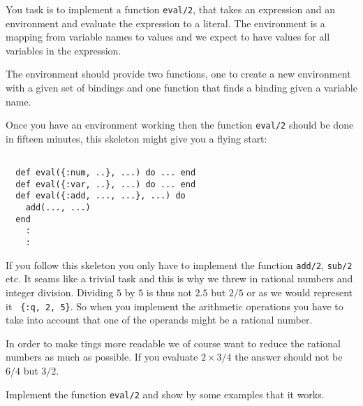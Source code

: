 \documentclass[a4paper,11pt]{article}
\begin{document}
You task is to implement a function {\tt eval/2}, that takes an
expression and an environment and evaluate the expression to a
literal. The environment is a mapping from variable names to values
and we expect to have values for all variables in the expression.

The environment should provide two functions, one to create a new
environment with a given set of bindings and one function that finds
a binding given a variable name. 

Once you have an environment working then the function {\tt eval/2}
should be done in fifteen minutes, this skeleton might give you a
flying start:

\begin{verbatim}

  def eval({:num, ..}, ...) do ... end
  def eval({:var, ..}, ...) do ... end
  def eval({:add, ..., ...}, ...) do
    add(..., ...)
  end
    :
    : 
\end{verbatim}

If you follow this skeleton you only have to implement the function
{\tt add/2}, {\tt sub/2} etc. It seams like a trivial task and this is
why we threw in rational numbers and integer division. Dividing $5$ by
$5$ is thus not $2.5$ but $2/5$ or as we would represent it {\tt
  \{:q, 2, 5\}}. So when you implement the arithmetic operations you
have to take into account that one of the operands might be a rational
number.

In order to make tings more readable we of course want to reduce the
rational numbers as much as possible. If you evaluate $2 \times 3/4$
the answer should not be $6/4$ but $3/2$.

Implement the function {\tt eval/2} and show by some examples that it
works.
\end{document}
